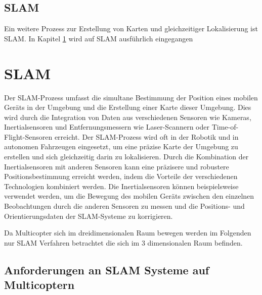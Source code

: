 \subsection{SLAM}

Ein weitere Prozess zur Erstellung von Karten und gleichzeitiger Lokalisierung ist \ac{SLAM}. 
In Kapitel \ref{SLAM:section} wird auf \ac{SLAM} ausführlich eingegangen
\section{SLAM}\label{SLAM:section} 

Der SLAM-Prozess umfasst die simultane Bestimmung der Position eines mobilen Geräts in der Umgebung und die Erstellung einer Karte dieser Umgebung. Dies wird durch die Integration von Daten aus verschiedenen Sensoren wie Kameras, Inertialsensoren und Entfernungsmessern wie Laser-Scannern oder Time-of-Flight-Sensoren erreicht. Der SLAM-Prozess wird oft in der Robotik und in autonomen Fahrzeugen eingesetzt, um eine präzise Karte der Umgebung zu erstellen und sich gleichzeitig darin zu lokalisieren.
Durch die Kombination der Inertialsensoren mit anderen Sensoren kann eine präzisere und robustere Positionsbestimmung erreicht werden, indem die Vorteile der verschiedenen Technologien kombiniert werden. Die Inertialsensoren können beispielsweise verwendet werden, um die Bewegung des mobilen Geräts zwischen den einzelnen Beobachtungen durch die anderen Sensoren zu messen und die Positions- und Orientierungsdaten der SLAM-Systeme zu korrigieren.

Da Multicopter sich im dreidimensionalen Raum bewegen werden im Folgenden nur \ac{SLAM} Verfahren betrachtet die sich im 3 dimensionalen Raum befinden.

\subsection{Anforderungen an SLAM Systeme auf Multicoptern}

